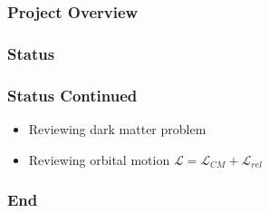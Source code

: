 \documentclass[18pt]{beamer}
\begin{document}
\begin{frame}
    \frametitle{Project Overview}

\end{frame}










\begin{frame}
    \frametitle{Status}

\end{frame}










\begin{frame}
    \frametitle{Status Continued}
    \begin{itemize}
        \item Reviewing dark matter problem
        \item Reviewing orbital motion $\mathcal{L}=\mathcal{L}_{CM}+\mathcal{L}_{rel}$
    \end{itemize}
\end{frame}










    \begin{frame}
        \frametitle{End}
        \end{frame}
\end{document}
